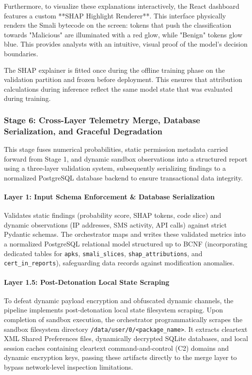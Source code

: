 \documentclass[10pt,a4paper]{article}
\begin{document}
Furthermore, to visualize these explanations interactively, the React dashboard features a custom **SHAP Highlight Renderer**. This interface physically renders the Smali bytecode on the screen: tokens that push the classification towards "Malicious" are illuminated with a red glow, while "Benign" tokens glow blue. This provides analysts with an intuitive, visual proof of the model's decision boundaries.

The SHAP explainer is fitted once during the offline training phase on the validation partition and frozen before deployment. This ensures that attribution calculations during inference reflect the same model state that was evaluated during training.

\subsubsection*{Stage 6: Cross-Layer Telemetry Merge, Database Serialization, and Graceful Degradation}

This stage fuses numerical probabilities, static permission metadata carried forward from Stage 1, and dynamic sandbox observations into a structured report using a three-layer validation system, subsequently serializing findings to a normalized PostgreSQL database backend to ensure transactional data integrity.

\paragraph{Layer 1: Input Schema Enforcement \& Database Serialization}
Validates static findings (probability score, SHAP tokens, code slice) and dynamic observations (IP addresses, SMS activity, API calls) against strict Pydantic schemas. The orchestrator maps and writes these validated metrics into a normalized PostgreSQL relational model structured up to BCNF (incorporating dedicated tables for \texttt{apks}, \texttt{smali\_slices}, \texttt{shap\_attributions}, and \texttt{cert\_in\_reports}), safeguarding data records against modification anomalies.

\paragraph{Layer 1.5: Post-Detonation Local State Scraping}
To defeat dynamic payload encryption and obfuscated dynamic channels, the pipeline implements post-detonation local state filesystem scraping. Upon completion of sandbox execution, the orchestrator programmatically scrapes the sandbox filesystem directory \texttt{/data/user/0/<package\_name>}. It extracts cleartext XML Shared Preferences files, dynamically decrypted SQLite databases, and local session caches containing cleartext command-and-control (C2) domains and dynamic encryption keys, passing these artifacts directly to the merge layer to bypass network-level inspection limitations.
\end{document}
